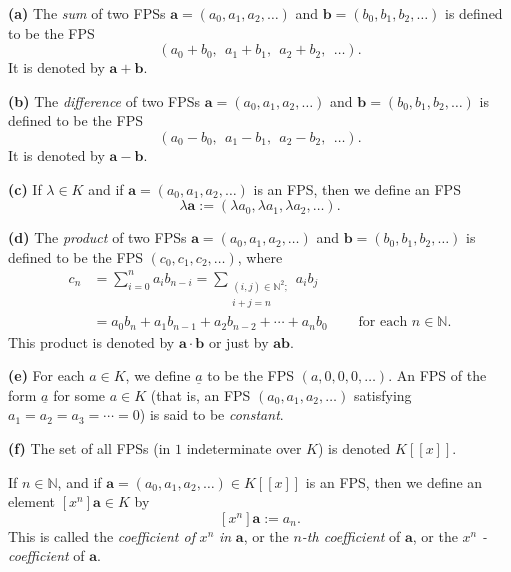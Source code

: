 \begin{definition}
\label{def.fps.ops}
\leantarget
\leanok
\textbf{(a)} The \emph{sum} of two FPSs $\mathbf{a}=\left(
a_{0},a_{1},a_{2},\ldots\right)$ and $\mathbf{b}=\left(b_{0},b_{1}%
,b_{2},\ldots\right)$ is defined to be the FPS%
\[
\left(a_{0}+b_{0},\ \ a_{1}+b_{1},\ \ a_{2}+b_{2},\ \ \ldots\right).
\]
It is denoted by $\mathbf{a}+\mathbf{b}$. \medskip

\textbf{(b)} The \emph{difference} of two FPSs $\mathbf{a}=\left(a_{0}%
,a_{1},a_{2},\ldots\right)$ and $\mathbf{b}=\left(b_{0},b_{1},b_{2}%
,\ldots\right)$ is defined to be the FPS%
\[
\left(a_{0}-b_{0},\ \ a_{1}-b_{1},\ \ a_{2}-b_{2},\ \ \ldots\right).
\]
It is denoted by $\mathbf{a}-\mathbf{b}$. \medskip

\textbf{(c)} If $\lambda\in K$ and if $\mathbf{a}=\left(a_{0},a_{1}%
,a_{2},\ldots\right)$ is an FPS, then we define an FPS
\[
\lambda\mathbf{a}:=\left(\lambda a_{0},\lambda a_{1},\lambda a_{2}%
,\ldots\right).
\]

\textbf{(d)} The \emph{product} of two FPSs $\mathbf{a}=\left(a_{0}%
,a_{1},a_{2},\ldots\right)$ and $\mathbf{b}=\left(b_{0},b_{1},b_{2}%
,\ldots\right)$ is defined to be the FPS $\left(c_{0},c_{1},c_{2}%
,\ldots\right)$, where
\begin{align*}
c_{n} & =\sum_{i=0}^{n}a_{i}b_{n-i}=\sum_{\substack{\left(i,j\right)
\in\mathbb{N}^{2};\\i+j=n}}a_{i}b_{j}\\
& =a_{0}b_{n}+a_{1}b_{n-1}+a_{2}b_{n-2}+\cdots+a_{n}b_{0}%
\ \ \ \ \ \ \ \ \ \ \text{for each }n\in\mathbb{N}.
\end{align*}
This product is denoted by $\mathbf{a}\cdot\mathbf{b}$ or just by
$\mathbf{ab}$. \medskip

\textbf{(e)} For each $a\in K$, we define $\underline{a}$ to be the FPS
$\left(a,0,0,0,\ldots\right)$. An FPS of the form $\underline{a}$ for some
$a\in K$ (that is, an FPS $\left(a_{0},a_{1},a_{2},\ldots\right)$
satisfying $a_{1}=a_{2}=a_{3}=\cdots=0$) is said to be \emph{constant}.
\medskip

\textbf{(f)} The set of all FPSs (in $1$ indeterminate over $K$) is denoted
$K\left[\left[x\right]\right]$.
\end{definition}

\begin{definition}
\label{def.fps.coeff}
\leantarget
\leanok
If $n\in\mathbb{N}$, and if $\mathbf{a}=\left(
a_{0},a_{1},a_{2},\ldots\right) \in K\left[\left[x\right]\right]$ is
an FPS, then we define an element $\left[x^{n}\right]\mathbf{a}\in K$ by
\[
\left[x^{n}\right]\mathbf{a}:=a_{n}.
\]
This is called the \emph{coefficient of }$x^{n}$\emph{ in }$\mathbf{a}$, or
the $n$\emph{-th coefficient} of $\mathbf{a}$, or the $x^{n}$%
\emph{-coefficient} of $\mathbf{a}$.
\end{definition}

